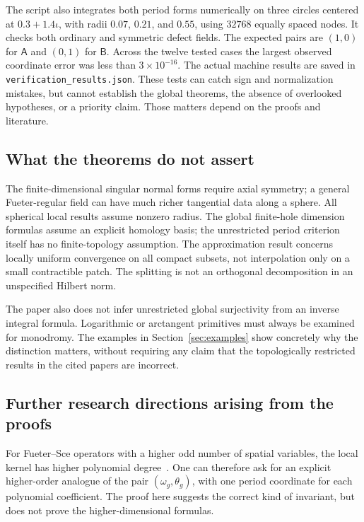 \documentclass[11pt,a4paper]{article}
\numberwithin{equation}{section}
\theoremstyle{definition}
\theoremstyle{remark}
\newcommand{\Adef}{\mathsf A}
\newcommand{\Bdef}{\mathsf B}
\begin{document}
The script also integrates both period forms numerically on three
circles centered at $0.3+1.4\iota$, with radii $0.07$, $0.21$, and
$0.55$, using $32768$ equally spaced nodes. It checks both ordinary
and symmetric defect fields. The expected pairs are $(1,0)$ for
$\Adef$ and $(0,1)$ for $\Bdef$. Across the twelve tested cases the
largest observed coordinate error was less than $3\times10^{-16}$.
The actual machine results are saved in
\texttt{verification\_results.json}.
These tests can catch sign and normalization mistakes, but cannot
establish the global theorems, the absence of overlooked hypotheses,
or a priority claim. Those matters depend on the proofs and literature.

\subsection{What the theorems do not assert}
The finite-dimensional singular normal forms require axial symmetry;
a general Fueter-regular field can have much richer tangential data
along a sphere. All spherical local results assume nonzero radius.
The global finite-hole dimension formulas assume an explicit homology
basis; the unrestricted period criterion itself has no finite-topology
assumption. The approximation result concerns locally uniform
convergence on all compact subsets, not interpolation only on a small
contractible patch. The splitting is not an orthogonal decomposition
in an unspecified Hilbert norm.

The paper also does not infer unrestricted global surjectivity from an
inverse integral formula. Logarithmic or arctangent primitives must
always be examined for monodromy. The examples in Section~\ref{sec:examples}
show concretely why the distinction matters, without requiring any
claim that the topologically restricted results in the cited papers
are incorrect.

\subsection{Further research directions arising from the proofs}
For Fueter--Sce operators with a higher odd number of spatial
variables, the local kernel has higher polynomial degree~\cite{CPSS}. One can therefore ask for an explicit
higher-order analogue of the pair $(\omega_g,\theta_g)$, with one
period coordinate for each polynomial coefficient. The proof here
suggests the correct kind of invariant, but does not prove the
higher-dimensional formulas.
\end{document}
